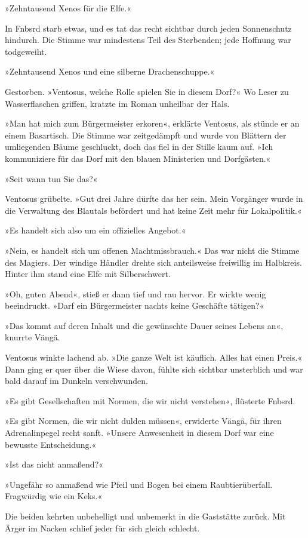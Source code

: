 »Zehntausend Xenos für die Elfe.«

In Fnbsrd starb etwas, und es tat das recht sichtbar durch jeden Sonnenschutz hindurch. Die Stimme war mindestens Teil des Sterbenden; jede Hoffnung war todgeweiht.

»Zehntausend Xenos und eine silberne Drachenschuppe.«

Gestorben. »Ventosus, welche Rolle spielen Sie in diesem Dorf?« Wo Leser zu Wasserflaschen griffen, kratzte im Roman unheilbar der Hals.

»Man hat mich zum Bürgermeister erkoren«, erklärte Ventosus, als stünde er an einem Basartisch. Die Stimme war zeitgedämpft und wurde von Blättern der umliegenden Bäume geschluckt, doch das fiel in der Stille kaum auf. »Ich kommuniziere für das Dorf mit den blauen Ministerien und Dorfgästen.«

»Seit wann tun Sie das?«

Ventosus grübelte. »Gut drei Jahre dürfte das her sein. Mein Vorgänger wurde in die Verwaltung des Blautals befördert und hat keine Zeit mehr für Lokalpolitik.«

»Es handelt sich also um ein offizielles Angebot.«

»Nein, es handelt sich um offenen Machtmissbrauch.« Das war nicht die Stimme des Magiers. Der windige Händler drehte sich anteilsweise freiwillig im Halbkreis. Hinter ihm stand eine Elfe mit Silberschwert.

»Oh, guten Abend«, stieß er dann tief und rau hervor. Er wirkte wenig beeindruckt. »Darf ein Bürgermeister nachts keine Geschäfte tätigen?«

»Das kommt auf deren Inhalt und die gewünschte Dauer seines Lebens an«, knurrte Vängä.

Ventosus winkte lachend ab. »Die ganze Welt ist käuflich. Alles hat einen Preis.« Dann ging er quer über die Wiese davon, fühlte sich sichtbar unsterblich und war bald darauf im Dunkeln verschwunden.

»Es gibt Gesellschaften mit Normen, die wir nicht verstehen«, flüsterte Fnbsrd.

»Es gibt Normen, die wir nicht dulden müssen«, erwiderte Vängä, für ihren Adrenalinpegel recht sanft. »Unsere Anwesenheit in diesem Dorf war eine bewusste Entscheidung.«

»Ist das nicht anmaßend?«

»Ungefähr so anmaßend wie Pfeil und Bogen bei einem Raubtierüberfall. Fragwürdig wie ein Keks.«

Die beiden kehrten unbehelligt und unbemerkt in die Gaststätte zurück. Mit Ärger im Nacken schlief jeder für sich gleich schlecht.


